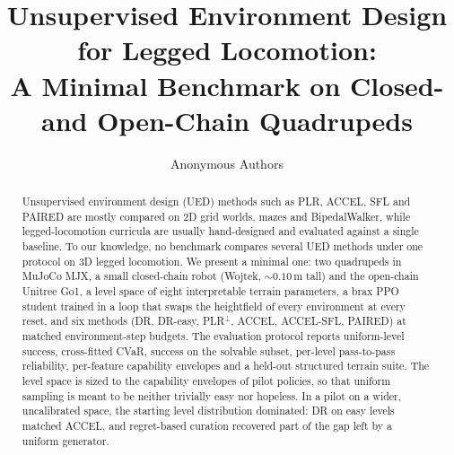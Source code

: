 \documentclass[10pt]{article}
\title{Unsupervised Environment Design for Legged Locomotion:\\
A Minimal Benchmark on Closed- and Open-Chain Quadrupeds}
\author{Anonymous Authors}
\date{}
\begin{document}
\maketitle

\begin{abstract}
Unsupervised environment design (UED) methods such as PLR, ACCEL, SFL and
PAIRED are mostly compared on 2D grid worlds, mazes and BipedalWalker, while
legged-locomotion curricula are usually hand-designed and evaluated against
a single baseline. To our knowledge, no benchmark compares several UED
methods under one protocol on 3D legged locomotion.
We present a minimal one: two quadrupeds in MuJoCo MJX, a small closed-chain
robot (Wojtek, ${\sim}0.10$\,m tall) and the open-chain Unitree Go1, a
level space of eight interpretable terrain parameters, a brax PPO student
trained in a loop that swaps the heightfield of every environment at every
reset, and six methods (DR, DR-easy, PLR$^\perp$, ACCEL, ACCEL-SFL, PAIRED)
at matched environment-step budgets.
The evaluation protocol reports uniform-level success, cross-fitted CVaR,
success on the solvable subset, per-level pass-to-pass reliability,
per-feature capability envelopes and a held-out structured terrain suite.
The level space is sized to the capability envelopes of pilot policies, so
that uniform sampling is meant to be neither trivially easy nor hopeless.
In a pilot on a wider, uncalibrated space, the starting level distribution
dominated: DR on easy levels matched ACCEL, and regret-based curation
recovered part of the gap left by a uniform generator.
\end{abstract}












\clearpage
\appendix

\end{document}
